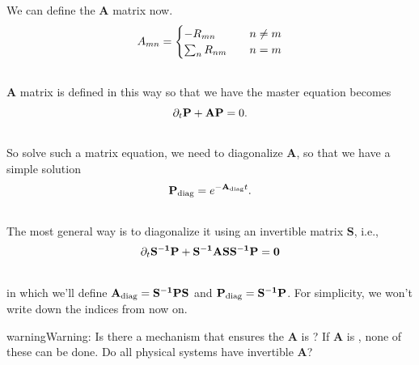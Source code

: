 \documentclass[letterpaper,10pt,english]{sphinxmanual}
\begin{document}
We can define the $\mathbf A$ matrix now.
\begin{gather}
\begin{split}A_{mn} = \begin{cases} -R_{mn} &\quad  n \neq m \\ \sum_{n} R_{nm} & \quad n=m  \end{cases}\end{split}\notag\\\begin{split}\end{split}\notag
\end{gather}
$\mathbf A$ matrix is defined in this way so that we have the master equation becomes
\begin{gather}
\begin{split}\partial_t \mathbf P + \mathbf A \mathbf P = 0 .\end{split}\notag\\\begin{split}\end{split}\notag
\end{gather}
So solve such a matrix equation, we need to diagonalize $\mathbf A$, so that we have a simple solution
\begin{gather}
\begin{split}\mathbf P_{\text{diag}} = e^{- \mathbf A_{\text{diag}} t} .\end{split}\notag\\\begin{split}\end{split}\notag
\end{gather}
The most general way is to diagonalize it using an invertible matrix $\mathbf S$, i.e.,
\begin{gather}
\begin{split}\partial_t \bf S^{-1} P + S^{-1}AS S^{-1} P = 0\end{split}\notag\\\begin{split}\end{split}\notag
\end{gather}
in which we'll define $\mathbf A_{\text{diag}} = \bf S^{-1} P S$ and $\mathbf P_{\text{diag}} = \bf S^{-1} P$. For simplicity, we won't write down the indices from now on.

\begin{notice}{warning}{Warning:}
Is there a mechanism that ensures the $\mathbf A$ is  ? If $\mathbf A$ is  , none of these can be done. Do all physical systems have invertible $\mathbf A$?
\end{notice}
\end{document}
